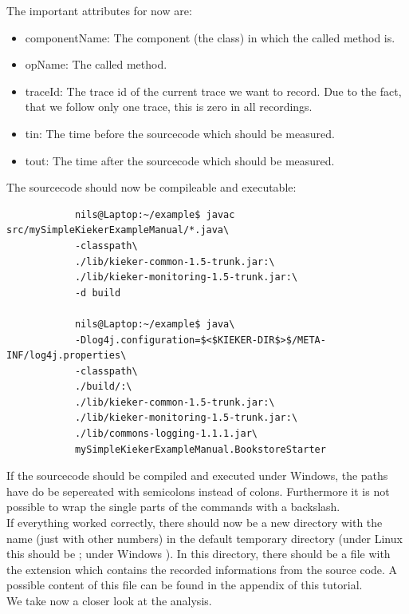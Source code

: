 		The important attributes for now are:
		\begin{itemize}
			\item componentName: The component (the class) in which the called method is.
			\item opName: The called method.
			\item traceId: The trace id of the current trace we want to record. Due to the fact, that we follow only one trace, this is zero in all recordings.
			\item tin: The time before the sourcecode which should be measured.
			\item tout: The time after the sourcecode which should be measured.
		\end{itemize}
		The sourcecode should now be compileable and executable:

		\setBashListing 		
		\begin{lstlisting} 			
			nils@Laptop:~/example$ javac src/mySimpleKiekerExampleManual/*.java\
			-classpath\ 		
			./lib/kieker-common-1.5-trunk.jar:\
			./lib/kieker-monitoring-1.5-trunk.jar:\
			-d build

			nils@Laptop:~/example$ java\
			-Dlog4j.configuration=$<$KIEKER-DIR$>$/META-INF/log4j.properties\
			-classpath\ 	
			./build/:\
			./lib/kieker-common-1.5-trunk.jar:\
			./lib/kieker-monitoring-1.5-trunk.jar:\
			./lib/commons-logging-1.1.1.jar\
			mySimpleKiekerExampleManual.BookstoreStarter 
		\end{lstlisting}			

		\warning If the sourcecode should be compiled and executed under Windows, the paths have do be sepereated with semicolons instead of colons. Furthermore it is not possible to wrap the single parts of the commands with a backslash.\\
		If everything worked correctly, there should now be a new directory with the name  (just with other numbers) in the default temporary directory (under Linux this should be ; under Windows ). In this directory, there should be a file with the extension  which contains the recorded informations from the source code. A possible content of this file can be found in the appendix of this tutorial.\\
		We take now a closer look at the analysis.

